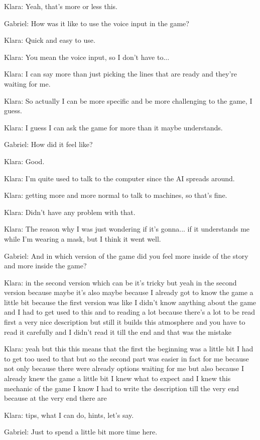 Klara: Yeah, that's more or less this.

Gabriel: How was it like to use the voice input in the game?

Klara: Quick and easy to use.

Klara: You mean the voice input, so I don't have to...

Klara: I can say more than just picking the lines that are ready and they're waiting for me.

Klara: So actually I can be more specific and be more challenging to the game, I guess.

Klara: I guess I can ask the game for more than it maybe understands.

Gabriel: How did it feel like?

Klara: Good.

Klara: I'm quite used to talk to the computer since the AI spreads around.

Klara: getting more and more normal to talk to machines, so that's fine.

Klara: Didn't have any problem with that.

Klara: The reason why I was just wondering if it's gonna... if it understands me while I'm wearing a mask, but I think it went well.

Gabriel: And in which version of the game did you feel more inside of the story and more inside the game?

Klara: in the second version which can be it's tricky but yeah in the second version because maybe it's also maybe because I already got to know the game a little bit because the first version was like I didn't know anything about the game and I had to get used to this and to reading a lot because there's a lot to be read first a very nice description but still it builds this atmosphere and you have to read it carefully and I didn't read it till the end and that was the mistake

Klara: yeah but this this means that the first the beginning was a little bit I had to get too used to that but so the second part was easier in fact for me because not only because there were already options waiting for me but also because I already knew the game a little bit I knew what to expect and I knew this mechanic of the game I know I had to write the description till the very end because at the very end there are

Klara: tips, what I can do, hints, let's say.

Gabriel: Just to spend a little bit more time here.

